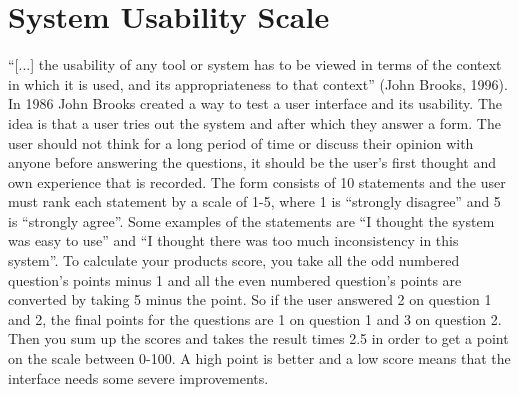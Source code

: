 \section{System Usability Scale}
``[...] the usability of any tool or system has to be viewed in terms of the context in which it is used, and its appropriateness to that context'' (John Brooks, 1996). In 1986 John Brooks created a way to test a user interface and its usability. The idea is that a user tries out the system and after which they answer a form. The user should not think for a long period of time or discuss their opinion with anyone before answering the questions, it should be the user’s first thought and own experience that is recorded. The form consists of 10 statements and the user must rank each statement by a scale of 1-5, where 1 is ``strongly disagree'' and 5 is ``strongly agree''. Some examples of the statements are ``I thought the system was easy to use'' and ``I thought there was too much inconsistency in this system''. To calculate your products score, you take all the odd numbered question’s points minus 1 and all the even numbered question’s points are converted by taking 5 minus the point. So if the user answered 2 on question 1 and 2, the final points for the questions are 1 on question 1 and 3 on question 2. Then you sum up the scores and takes the result times 2.5 in order to get a point on the scale between 0-100. A high point is better and a low score means that the interface needs some severe improvements.